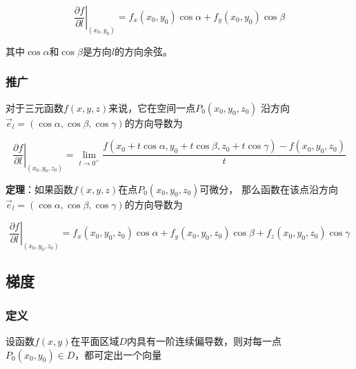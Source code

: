 \documentclass[12pt, a4paper]{article}
\numberwithin{equation}{section}
\begin{document}
    \begin{equation}
        \left.\frac{\partial f}{\partial l}\right|_{\left(x_0, y_0\right)}=f_x\left(x_0, y_0\right) \cos \alpha+f_y\left(x_0, y_0\right) \cos \beta
    \end{equation}

    其中\(\cos \alpha\)和\(\cos \beta\)是方向\(l\)的方向余弦。

\subsubsection{推广}


    对于三元函数\(f\left(x,y,z\right)\)来说，它在空间一点\(P_0\left(x_0,y_0,z_0\right)\)
    沿方向\\\(\overrightarrow{e}_l = \left(\cos \alpha, \cos \beta, \cos \gamma\right)\)的方向导数为

    \begin{equation}
        \left.\frac{\partial f}{\partial l}\right|_{\left(x_0, y_0, z_0\right)}=
        \lim _{t \rightarrow 0^{+}} \frac{f\left(x_0+t \cos \alpha, y_0+t \cos \beta, z_0
        +t \cos \gamma\right)-f\left(x_0, y_0, z_0\right)}{t}
        \end{equation}

    \textbf{定理}：如果函数\(f\left(x,y,z\right)\)在点\(P_0\left(x_0,y_0,z_0\right)\)可微分，
    那么函数在该点沿方向\\\(\overrightarrow{e}_l = \left(\cos \alpha, \cos \beta, \cos \gamma\right)\)的方向导数为

    \begin{equation}
        \left.\frac{\partial f}{\partial l}\right|_{\left(x_0, y_0, z_0\right)}=
        f_x\left(x_0, y_0, z_0\right) \cos \alpha+f_y\left(x_0, y_0, z_0\right) \cos \beta+
        f_z\left(x_0, y_0, z_0\right) \cos \gamma
    \end{equation}

\subsection{梯度}

\subsubsection{定义}

    设函数\(f\left(x,y\right)\)在平面区域\(D\)内具有一阶连续偏导数，则对每一点
    \(P_0\left(x_0,y_0\right) \in D\)，都可定出一个向量
\end{document}
